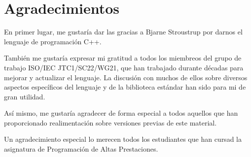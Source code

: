 \chapter*{Agradecimientos}

En primer lugar, me gustaría dar las gracias a Bjarne Stroustrup
por darnos el lenguaje de programación C++.

También me gustaría expresar mi gratitud a todos los miembreos del
grupo de trabajo ISO/IEC JTC1/SC22/WG21, que han trabajado durante
décadas para mejorar y actualizar el lenguaje.
La discusión con muchos de ellos sobre diversos aspectos específicos
del lenguaje y de la biblioteca estándar han sido para mi de gran utilidad.

Así mismo, me gustaría agradecer de forma especial a todos aquellos
que han proporcionado realimentación sobre versiones previas de este 
material.

Un agradecimiento especial lo merecen todos los estudiantes que han cursad
la asignatura de Programación de Altas Prestaciones.

